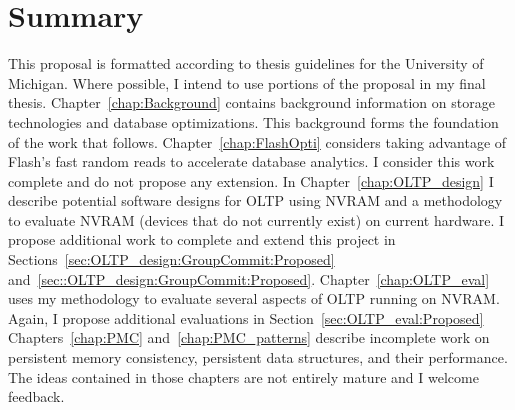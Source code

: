 \section{Summary}
\label{sec:Intro:Summary}
This proposal is formatted according to thesis guidelines for the University of Michigan.
Where possible, I intend to use portions of the proposal in my final thesis.
Chapter~\ref{chap:Background} contains background information on storage technologies and database optimizations.
This background forms the foundation of the work that follows.
Chapter~\ref{chap:FlashOpti} considers taking advantage of Flash's fast random reads to accelerate database analytics.
I consider this work complete and do not propose any extension.
In Chapter~\ref{chap:OLTP_design} I describe potential software designs for OLTP using NVRAM and a methodology to evaluate NVRAM (devices that do not currently exist) on current hardware.
I propose additional work to complete and extend this project in Sections~\ref{sec:OLTP_design:GroupCommit:Proposed} and~\ref{sec::OLTP_design:GroupCommit:Proposed}.
Chapter~\ref{chap:OLTP_eval} uses my methodology to evaluate several aspects of OLTP running on NVRAM.
Again, I propose additional evaluations in Section~\ref{sec:OLTP_eval:Proposed}
Chapters~\ref{chap:PMC} and~\ref{chap:PMC_patterns} describe incomplete work on persistent memory consistency, persistent data structures, and their performance.
The ideas contained in those chapters are not entirely mature and I welcome feedback.
